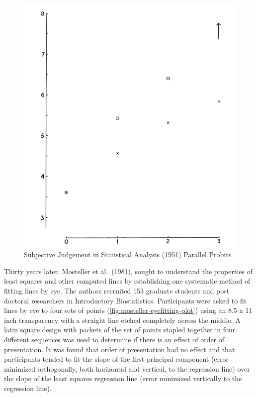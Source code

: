 \documentclass[12pt]{article}
\begin{document}
\begin{figure}[tbp]

{\centering \includegraphics[width=0.5\linewidth,]{images/subjective-judgement-plot} 

}

\caption{Subjective Judgement in Statistical Analysis (1951) Parallel Probits}\label{fig:subjective-judgement}
\end{figure}

Thirty years later, Mosteller et al.~(1981), sought to understand the
properties of least squares and other computed lines by establishing one
systematic method of fitting lines by eye. The authors recruited 153
graduate students and post doctoral researchers in Introductory
Biostatistics. Participants were asked to fit lines by eye to four sets
of points (\cref{fig:mosteller-eyefitting-plot}) using an 8.5 x 11 inch
transparency with a straight line etched completely across the middle. A
latin square design \citep{giesbrecht2004planning} with packets of the
set of points stapled together in four different sequences was used to
determine if there is an effect of order of presentation. It was found
that order of presentation had no effect and that participants tended to
fit the slope of the first principal component (error minimized
orthogonally, both horizontal and vertical, to the regression line) over
the slope of the least squares regression line (error minimized
vertically to the regression line).
\end{document}
